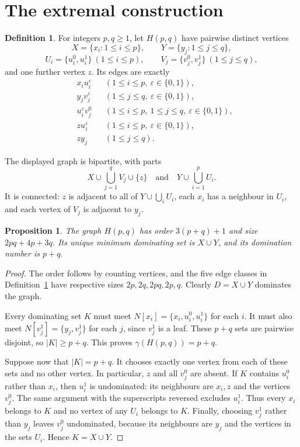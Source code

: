 \documentclass[11pt]{article}
\newtheorem{proposition}[theorem]{Proposition}
\theoremstyle{definition}
\newtheorem{definition}[theorem]{Definition}
\theoremstyle{remark}
\begin{document}
\section{The extremal construction}\label{sec:construction}

\begin{definition}\label{def:H}
For integers $p,q\ge1$, let $H(p,q)$ have pairwise distinct vertices
\[
 X=\{x_i:1\le i\le p\},\qquad Y=\{y_j:1\le j\le q\},
\]
\[
 U_i=\{u_i^0,u_i^1\}\ (1\le i\le p),\qquad
 V_j=\{v_j^0,v_j^1\}\ (1\le j\le q),
\]
and one further vertex $z$. Its edges are exactly
\begin{align*}
 &x_i u_i^\varepsilon &&(1\le i\le p,\ \varepsilon\in\{0,1\}),\\
 &y_j v_j^\varepsilon &&(1\le j\le q,\ \varepsilon\in\{0,1\}),\\
 &u_i^\varepsilon v_j^0 &&(1\le i\le p,\ 1\le j\le q,\ \varepsilon\in\{0,1\}),\\
 &z u_i^\varepsilon &&(1\le i\le p,\ \varepsilon\in\{0,1\}),\\
 &z y_j &&(1\le j\le q).
\end{align*}
\end{definition}

The displayed graph is bipartite, with parts
\begin{equation}\label{eq:bipH}
 X\cup\bigcup_{j=1}^q V_j\cup\{z\}
 \quad\text{and}\quad
 Y\cup\bigcup_{i=1}^p U_i.
\end{equation}
It is connected: $z$ is adjacent to all of $Y\cup\bigcup_iU_i$, each $x_i$
has a neighbour in $U_i$, and each vertex of $V_j$ is adjacent to $y_j$.

\begin{proposition}\label{prop:H}
The graph $H(p,q)$ has order $3(p+q)+1$ and size $2pq+4p+3q$.
Its unique minimum dominating set is $X\cup Y$, and its domination number is
$p+q$.
\end{proposition}

\begin{proof}
The order follows by counting vertices, and the five edge classes in
Definition~\ref{def:H} have respective sizes $2p,2q,2pq,2p,q$.
Clearly $D=X\cup Y$ dominates the graph.

Every dominating set $K$ must meet $N[x_i]=\{x_i,u_i^0,u_i^1\}$ for each $i$.
It must also meet $N[v_j^1]=\{y_j,v_j^1\}$ for each $j$, since $v_j^1$ is a
leaf. These $p+q$ sets are pairwise disjoint, so $|K|\ge p+q$.
This proves $\gamma(H(p,q))=p+q$.

Suppose now that $|K|=p+q$. It chooses exactly one vertex from each of these
sets and no other vertex. In particular, $z$ and all $v_j^0$ are absent.
If $K$ contains $u_i^0$ rather than $x_i$, then $u_i^1$ is undominated:
its neighbours are $x_i,z$ and the vertices $v_j^0$. The same argument with
the superscripts reversed excludes $u_i^1$. Thus every $x_i$ belongs to $K$
and no vertex of any $U_i$ belongs to $K$.
Finally, choosing $v_j^1$ rather than $y_j$ leaves $v_j^0$ undominated,
because its neighbours are $y_j$ and the vertices in the sets $U_i$.
Hence $K=X\cup Y$.
\end{proof}
\end{document}

